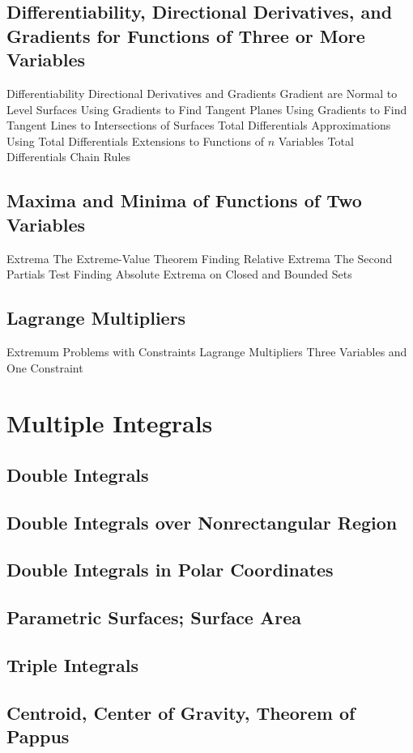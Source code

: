 \documentclass[]{article}
\begin{document}
\subsection{Differentiability, Directional Derivatives, and Gradients for Functions of Three or More Variables}
Differentiability
Directional Derivatives and Gradients
Gradient are Normal to Level Surfaces
Using Gradients to Find Tangent Planes
Using Gradients to Find Tangent Lines to Intersections of Surfaces
Total Differentials
Approximations Using Total Differentials
Extensions to Functions of $n$ Variables
Total Differentials
Chain Rules
\subsection{Maxima and Minima of Functions of Two Variables}
Extrema
The Extreme-Value Theorem
Finding Relative Extrema
The Second Partials Test
Finding Absolute Extrema on Closed and Bounded Sets
\subsection{Lagrange Multipliers}
Extremum Problems with Constraints
Lagrange Multipliers
Three Variables and One Constraint
\section{Multiple Integrals}
\subsection{Double Integrals}
\subsection{Double Integrals over Nonrectangular Region}
\subsection{Double Integrals in Polar Coordinates}
\subsection{Parametric Surfaces; Surface Area}
\subsection{Triple Integrals}
\subsection{Centroid, Center of Gravity, Theorem of Pappus}
\end{document}
